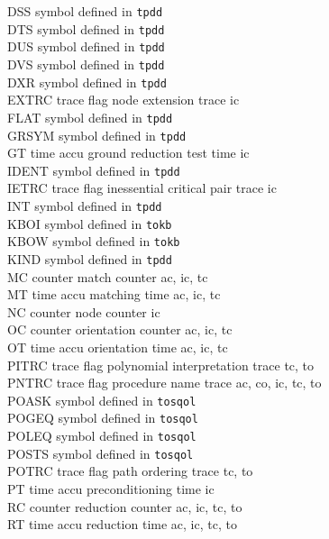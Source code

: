 \begin{tabbing}
DSS   \> symbol defined in {\tt tpdd} \\
DTS   \> symbol defined in {\tt tpdd} \\
DUS   \> symbol defined in {\tt tpdd} \\
DVS   \> symbol defined in {\tt tpdd} \\
DXR   \> symbol defined in {\tt tpdd} \\
EXTRC \> trace flag \> node extension trace \> ic \\
FLAT  \> symbol defined in {\tt tpdd} \\
GRSYM \> symbol defined in {\tt tpdd} \\
GT    \> time accu \> ground reduction test time \> ic \\
IDENT \> symbol defined in {\tt tpdd} \\
IETRC \> trace flag \> inessential critical pair trace \> ic \\
INT   \> symbol defined in {\tt tpdd} \\
KBOI  \> symbol defined in {\tt tokb} \\
KBOW  \> symbol defined in {\tt tokb} \\
KIND  \> symbol defined in {\tt tpdd} \\
MC    \> counter \> match counter \> ac, ic, tc \\
MT    \> time accu \> matching time \> ac, ic, tc \\
NC    \> counter \> node counter \> ic \\
OC    \> counter \> orientation counter \> ac, ic, tc \\
OT    \> time accu \> orientation time \> ac, ic, tc \\
PITRC \> trace flag \> polynomial interpretation trace \> tc, to \\
PNTRC \> trace flag \> procedure name trace \> ac, co, ic, tc, to \\
POASK \> symbol defined in {\tt tosqol} \\
POGEQ \> symbol defined in {\tt tosqol} \\
POLEQ \> symbol defined in {\tt tosqol} \\
POSTS \> symbol defined in {\tt tosqol} \\
POTRC \> trace flag \> path ordering trace \> tc, to \\
PT    \> time accu \> preconditioning time \>  ic \\
RC    \> counter \> reduction counter \> ac, ic, tc, to \\
RT    \> time accu \> reduction time \>  ac, ic, tc, to \\

\end{tabbing}
